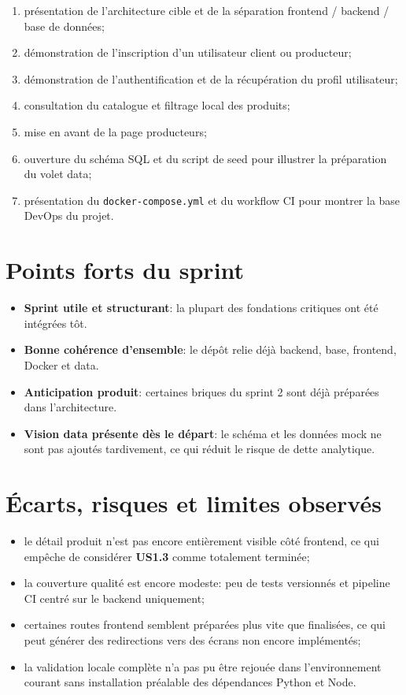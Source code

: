 \documentclass[11pt,a4paper]{article}
\begin{document}
\begin{enumerate}[leftmargin=1.5em]
  \item présentation de l'architecture cible et de la séparation frontend / backend / base de données;
  \item démonstration de l'inscription d'un utilisateur client ou producteur;
  \item démonstration de l'authentification et de la récupération du profil utilisateur;
  \item consultation du catalogue et filtrage local des produits;
  \item mise en avant de la page producteurs;
  \item ouverture du schéma SQL et du script de seed pour illustrer la préparation du volet data;
  \item présentation du \texttt{docker-compose.yml} et du workflow CI pour montrer la base DevOps du projet.
\end{enumerate}

\section{Points forts du sprint}

\begin{itemize}[leftmargin=1.5em]
  \item \textbf{Sprint utile et structurant}: la plupart des fondations critiques ont été intégrées tôt.
  \item \textbf{Bonne cohérence d'ensemble}: le dépôt relie déjà backend, base, frontend, Docker et data.
  \item \textbf{Anticipation produit}: certaines briques du sprint 2 sont déjà préparées dans l'architecture.
  \item \textbf{Vision data présente dès le départ}: le schéma et les données mock ne sont pas ajoutés tardivement, ce qui réduit le risque de dette analytique.
\end{itemize}

\section{Écarts, risques et limites observés}

\begin{itemize}[leftmargin=1.5em]
  \item le détail produit n'est pas encore entièrement visible côté frontend, ce qui empêche de considérer \textbf{US1.3} comme totalement terminée;
  \item la couverture qualité est encore modeste: peu de tests versionnés et pipeline CI centré sur le backend uniquement;
  \item certaines routes frontend semblent préparées plus vite que finalisées, ce qui peut générer des redirections vers des écrans non encore implémentés;
  \item la validation locale complète n'a pas pu être rejouée dans l'environnement courant sans installation préalable des dépendances Python et Node.
\end{itemize}
\end{document}
